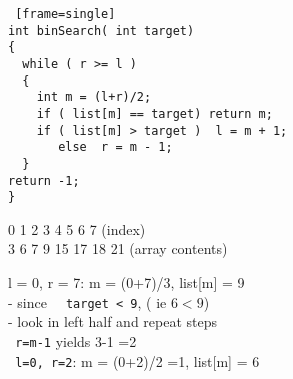 \documentclass[14pt]{article} %
\begin{document}
\begin{lstlisting} [frame=single]
int binSearch( int target)
{
  while ( r >= l )
  {
    int m = (l+r)/2;
    if ( list[m] == target) return m;
    if ( list[m] > target )  l = m + 1;
       else  r = m - 1;
  }
return -1;
}
 \end{lstlisting}
 

 
0  1  2   3   4    5   6    7     (index)  \\
3  6  7   9  15  17  18   21   (array contents)

l = 0, r = 7:    m = (0+7)/3,  list[m] = 9  \\
- since \lstinline!  target < 9!,   ( ie $6 < 9$)  \\  
- look in left half and repeat steps  \\ 


\lstinline! r=m-1! yields  3-1 =2  \\
\lstinline! l=0, r=2!:       m = (0+2)/2 =1,  list[m] = 6  \\
\end{document}
